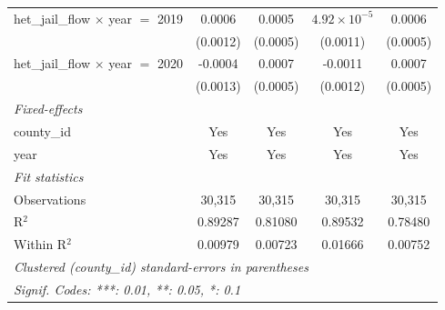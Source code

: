 \begin{tabular}{lcccc}
   het\_jail\_flow $\times$ year $=$ 2019                & 0.0006                 & 0.0005                    & $4.92\times 10^{-5}$   & 0.0006\\   
                                                         & (0.0012)               & (0.0005)                  & (0.0011)               & (0.0005)\\   
   het\_jail\_flow $\times$ year $=$ 2020                & -0.0004                & 0.0007                    & -0.0011                & 0.0007\\   
                                                         & (0.0013)               & (0.0005)                  & (0.0012)               & (0.0005)\\   
   \midrule
   \emph{Fixed-effects}\\
   county\_id                                            & Yes                    & Yes                       & Yes                    & Yes\\  
   year                                                  & Yes                    & Yes                       & Yes                    & Yes\\  
   \midrule
   \emph{Fit statistics}\\
   Observations                                          & 30,315                 & 30,315                    & 30,315                 & 30,315\\  
   R$^2$                                                 & 0.89287                & 0.81080                   & 0.89532                & 0.78480\\  
   Within R$^2$                                          & 0.00979                & 0.00723                   & 0.01666                & 0.00752\\  
   \midrule \midrule
   \multicolumn{5}{l}{\emph{Clustered (county\_id) standard-errors in parentheses}}\\
   \multicolumn{5}{l}{\emph{Signif. Codes: ***: 0.01, **: 0.05, *: 0.1}}\\
\end{tabular}
\par\endgroup


